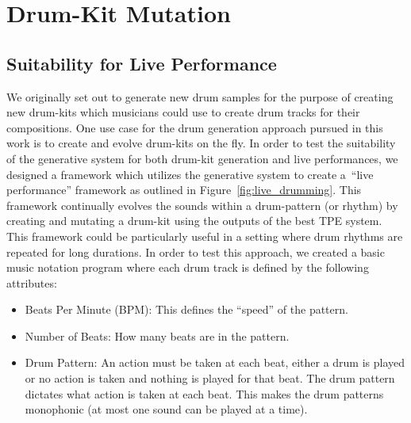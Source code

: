 \documentclass[\main/thesis.tex]{subfiles}
\begin{document}
\chapter{Drum-Kit Mutation}
\section{Suitability for Live Performance}

We originally set out to generate new drum samples for the purpose of creating new drum-kits which musicians could use to create drum tracks for their compositions. One use case for the drum generation approach pursued in this work is to create and evolve drum-kits on the fly.  In order to test the suitability of the generative system for both drum-kit generation and live performances, we designed a framework which utilizes the generative system to create a~\enquote{live performance} framework as outlined in Figure~\ref{fig:live_drumming}. This framework continually evolves the sounds within a drum-pattern (or rhythm) by creating and mutating a drum-kit using the outputs of the best TPE system. This framework could be particularly useful in a setting where drum rhythms are repeated for long durations. In order to test this approach, we created a basic music notation program where each drum track is defined by the following attributes:

\begin{itemize}
    \item Beats Per Minute (BPM): This defines the \enquote{speed} of the pattern. 
    \item Number of Beats: How many beats are in the pattern.
    \item Drum Pattern: An action must be taken at each beat, either a drum is played or no action is taken and nothing is played for that beat. The drum pattern dictates what action is taken at each beat. This makes the drum patterns monophonic (at most one sound can be played at a time).
\end{itemize}
\end{document}
